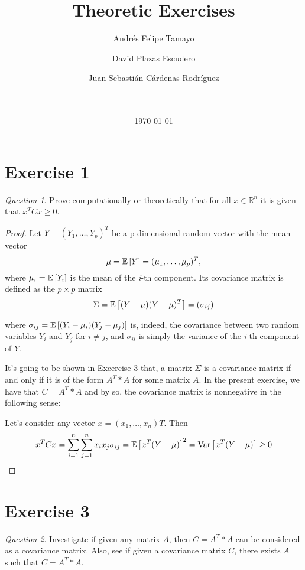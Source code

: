 \documentclass[11pt]{article}
\title{Theoretic Exercises}
\author{Andrés Felipe Tamayo \\
  \scalebox{0.7}{aftamayoa@eafit.edu.co} \and
  David Plazas Escudero \\
  \scalebox{0.7}{dplazas@eafit.edu.co} \and
  Juan Sebasti\'an C\'ardenas-Rodríguez \\
  \scalebox{0.7}{jscardenar@eafit.edu.co} \\ \\
  \scalebox{0.7}{Mathematical Engineering, Universidad EAFIT}}
\date{\today}
\theoremstyle{definition}
\theoremstyle{remark}
\theoremstyle{remark}
\theoremstyle{remark}
\newtheorem*{question}{Question}
\theoremstyle{proof}
\begin{document}
\maketitle

\section*{Exercise 1}

\begin{question}
  Prove computationally or theoretically that for all $x \in \mathbb{R}^{n}$ it
  is given that $x^{T}Cx \geq 0$.
\end{question}

\begin{proof}

  Let $Y = (Y_{1},\ldots,Y_{p})^{T}$ be a p-dimensional random vector with the
  mean vector
  \[
    \mu = \E{Y} = (\mu_{1},\ldots,\mu_{p})^{T},
  \]
  where $\mu_{i} = \E{Y_{i}}$ is the mean of the \textit{i}-th component. Its
  covariance matrix is defined as the $p \times p$ matrix
  \[
    \Sigma = \E{(Y - \mu)(Y - \mu)^{T}} = (\sigma_{ij})
  \]

  where $\sigma_{ij} = \E{(Y_{i} - \mu_{i})(Y_{j} - \mu_{j})}$ is, indeed, the
  covariance between two random variables $Y_{i}$ and $Y_{j}$ for $i \neq j$,
  and $\sigma_{ii}$ is simply the variance of the \textit{i}-th component of
  $Y$.

  It's going to be shown in Excercise 3 that, a matrix $\Sigma$ is a covariance
  matrix if and only if it is of the form $A^{T}*A$ for some matrix $A$. In the
  present exercise, we have that $C = A^{T}*A$ and by so, the covariance matrix
  is nonnegative in the following sense:

  Let's consider any vector $x = (x_{1},\ldots,x_{n})T$. Then
  \[
    x^{T}Cx = \sum_{i = 1}^{n}\sum_{j = 1}^{n} x_{i}x_{j}\sigma_{ij} = \E{x^{T}(Y - \mu)}^{2} = \V{x^{T}(Y - \mu)} \geq 0
  \]
\end{proof}

\section*{Exercise 3} \label{Ex3}
\begin{question}
  Investigate if given any matrix $A$, then $C = A^{T}*A$ can be considered as a
  covariance matrix. Also, see if given a covariance matrix $C$, there exists
  $A$ such that $C = A^{T} * A$.
\end{question}
\end{document}
